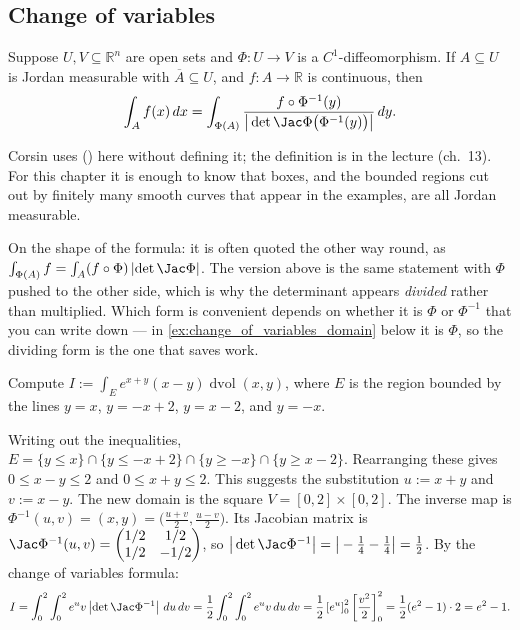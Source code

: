 \subsection{Change of variables}
\label{sec:change_of_variables}

\begin{theorem}
\label{thm:change_of_variables}
Suppose $U,V \subseteq \mathbb{R}^n$ are open sets and $\Phi : U \to V$ is a
$C^1$-diffeomorphism. If $A \subseteq U$ is Jordan measurable with $\overline{A} \subseteq U$,
and $f : A \to \mathbb{R}$ is continuous, then
\[\int_A f(x)\,dx
  = \int_{\Phi(A)} \frac{f\circ\Phi^{-1}(y)}{\big|\det \Jac\Phi\big(\Phi^{-1}(y)\big)\big|}\,dy.\]
\end{theorem}

\begin{ainote}
Corsin uses  () here without defining it;
the definition is in the lecture (ch.~13). For this chapter it is enough to know that boxes,
and the bounded regions cut out by finitely many smooth curves that appear in the examples, are
all Jordan measurable.

On the shape of the formula: it is often quoted the other way round, as
$\int_{\Phi(A)} f = \int_A (f\circ\Phi)\,\lvert\det\Jac\Phi\rvert$. The version above is the same
statement with $\Phi$ pushed to the other side, which is why the determinant appears
\emph{divided} rather than multiplied. Which form is convenient depends on whether it is $\Phi$
or $\Phi^{-1}$ that you can write down --- in \cref{ex:change_of_variables_domain} below it is
$\Phi$, so the dividing form is the one that saves work.
\end{ainote}

\begin{example}
\label{ex:change_of_variables_diamond}
Compute $I := \int_E e^{x+y}(x-y) \mathop{d\text{vol}}(x,y)$, where $E$ is the region bounded by the lines $y=x$, $y=-x+2$, $y=x-2$, and $y=-x$.

Writing out the inequalities, $E = \{ y \leq x \} \cap \{ y \leq -x+2 \} \cap \{ y \geq -x \} \cap \{ y \geq x-2 \}$.
Rearranging these gives $0 \leq x-y \leq 2$ and $0 \leq x+y \leq 2$.
This suggests the substitution $u := x+y$ and $v := x-y$. The new domain is the square $V = [0,2] \times [0,2]$.
The inverse map is $\Phi^{-1}(u,v) = (x,y) = \big(\frac{u+v}{2}, \frac{u-v}{2}\big)$.
Its Jacobian matrix is $\Jac\Phi^{-1}(u,v) = \begin{pmatrix} 1/2 & 1/2 \\ 1/2 & -1/2 \end{pmatrix}$, so $\big|\det\Jac\Phi^{-1}\big| = \big|-\frac{1}{4} - \frac{1}{4}\big| = \frac{1}{2}$.
By the change of variables formula:
\[I = \int_0^2 \int_0^2 e^u v \left|\det\Jac\Phi^{-1}\right| \,du\,dv = \frac{1}{2} \int_0^2 \int_0^2 e^u v \,du\,dv = \frac{1}{2} \left[ e^u \right]_0^2 \left[ \frac{v^2}{2} \right]_0^2 = \frac{1}{2} (e^2-1) \cdot 2 = e^2-1.\]
\end{example}

